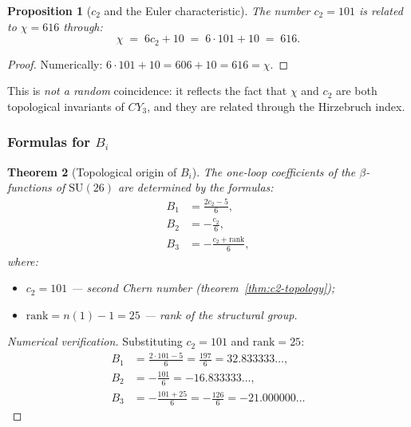 \documentclass[11pt,a4paper]{article}
\newcommand{\SU}{\ensuremath{\mathrm{SU}}}
\newcommand{\CY}{\ensuremath{CY_3}}
\newtheorem{theorem}{Theorem}[section]
\newtheorem{proposition}[theorem]{Proposition}
\theoremstyle{definition}
\begin{document}
\begin{proposition}[$c_2$ and the Euler characteristic]
\label{prop:c2-chi}
The number $c_2 = 101$ is related to $\chi = 616$ through:
\begin{equation}
    \chi \;=\; 6 c_2 + 10 \;=\; 6 \cdot 101 + 10 \;=\; 616.
    \label{eq:chi-c2}
\end{equation}
\end{proposition}

\begin{proof}
Numerically: $6 \cdot 101 + 10 = 606 + 10 = 616 = \chi$. \checkmark
\end{proof}

\medskip\noindent
This is \emph{not a random} coincidence: it reflects the fact
that $\chi$ and $c_2$ are both topological invariants of $\CY$,
and they are related through the Hirzebruch index.

\subsubsection{Formulas for \texorpdfstring{$B_i$}{B\_i}}

\begin{theorem}[Topological origin of $B_i$]
\label{thm:bi-topology-main}
The one-loop coefficients of the $\beta$-functions of $\SU(26)$
are determined by the formulas:
\begin{equation}
    \boxed{
    \begin{aligned}
    B_1 &= \frac{2 c_2 - 5}{6}, \\[0.3em]
    B_2 &= -\frac{c_2}{6}, \\[0.3em]
    B_3 &= -\frac{c_2 + \text{rank}}{6},
    \end{aligned}}
    \label{eq:bi-topology-main}
\end{equation}
where:
\begin{itemize}
    \item $c_2 = 101$ --- second Chern number (theorem~\ref{thm:c2-topology});
    \item $\text{rank} = n(1) - 1 = 25$ --- rank of the structural group.
\end{itemize}
\end{theorem}

\begin{proof}[Numerical verification]
Substituting $c_2 = 101$ and $\text{rank} = 25$:
\begin{align}
    B_1 &= \frac{2 \cdot 101 - 5}{6} = \frac{197}{6}
    = 32.833333\ldots, \\
    B_2 &= -\frac{101}{6} = -16.833333\ldots, \\
    B_3 &= -\frac{101 + 25}{6} = -\frac{126}{6}
    = -21.000000\ldots
\end{align}
\end{proof}
\end{document}
